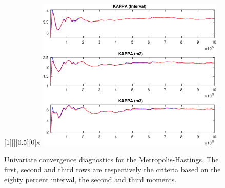 \begin{figure}[H]
[1][][0.5][0]{$ {\kappa} $}
\centering 
\includegraphics[width=0.80\textwidth]{KimModTheBuilder/Output/KimModTheBuilder_udiag3}
\caption{Univariate convergence diagnostics for the Metropolis-Hastings.
The first, second and third rows are respectively the criteria based on
the eighty percent interval, the second and third moments.}\label{Fig:UnivariateDiagnostics:3}
\end{figure}

